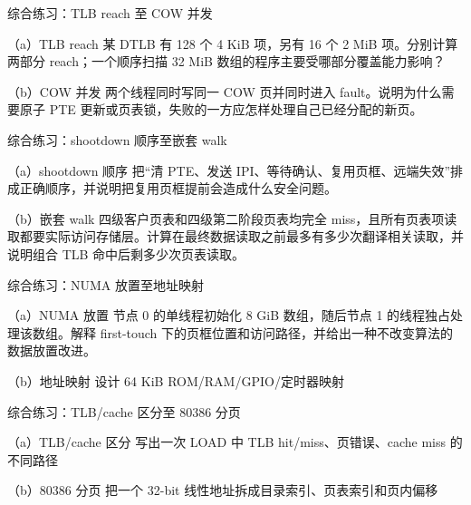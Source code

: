 \begin{chapterexercise}{综合练习：TLB reach 至 COW 并发}
\begin{exercisesubproblem}{（a）TLB reach}
某 DTLB 有 128 个 4 KiB 项，另有 16 个 2 MiB 项。分别计算两部分 reach；一个顺序扫描 32 MiB 数组的程序主要受哪部分覆盖能力影响？
\end{exercisesubproblem}
\begin{exercisesubproblem}{（b）COW 并发}
两个线程同时写同一 COW 页并同时进入 fault。说明为什么需要原子 PTE 更新或页表锁，失败的一方应怎样处理自己已经分配的新页。
\end{exercisesubproblem}
\end{chapterexercise}

\begin{chapterexercise}{综合练习：shootdown 顺序至嵌套 walk}
\begin{exercisesubproblem}{（a）shootdown 顺序}
把“清 PTE、发送 IPI、等待确认、复用页框、远端失效”排成正确顺序，并说明把复用页框提前会造成什么安全问题。
\end{exercisesubproblem}
\begin{exercisesubproblem}{（b）嵌套 walk}
四级客户页表和四级第二阶段页表均完全 miss，且所有页表项读取都要实际访问存储层。计算在最终数据读取之前最多有多少次翻译相关读取，并说明组合 TLB 命中后剩多少次页表读取。
\end{exercisesubproblem}
\end{chapterexercise}

\begin{chapterexercise}{综合练习：NUMA 放置至地址映射}
\begin{exercisesubproblem}{（a）NUMA 放置}
节点 0 的单线程初始化 8 GiB 数组，随后节点 1 的线程独占处理该数组。解释 first-touch 下的页框位置和访问路径，并给出一种不改变算法的数据放置改进。
\end{exercisesubproblem}
\begin{exercisesubproblem}{（b）地址映射}
设计 64 KiB ROM/RAM/GPIO/定时器映射
\end{exercisesubproblem}
\end{chapterexercise}

\begin{chapterexercise}{综合练习：TLB/cache 区分至 80386 分页}
\begin{exercisesubproblem}{（a）TLB/cache 区分}
写出一次 LOAD 中 TLB hit/miss、页错误、cache miss 的不同路径
\end{exercisesubproblem}
\begin{exercisesubproblem}{（b）80386 分页}
把一个 32-bit 线性地址拆成目录索引、页表索引和页内偏移
\end{exercisesubproblem}
\end{chapterexercise}

